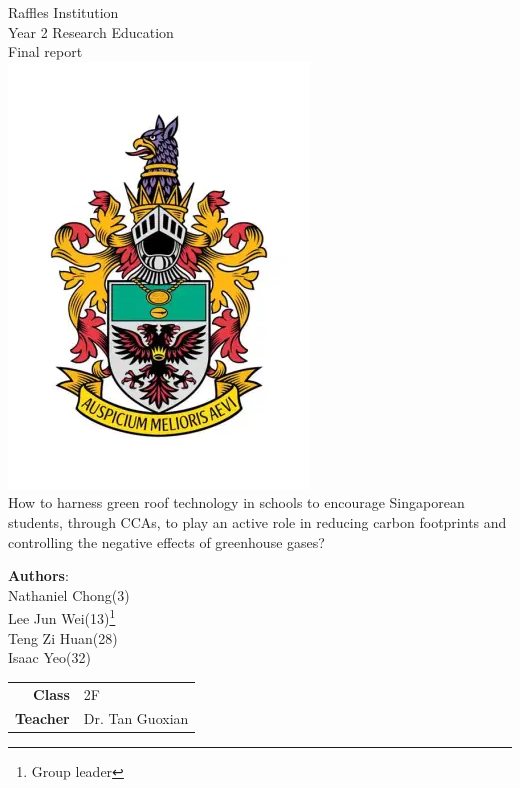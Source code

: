 \documentclass[a4paper]{article}
\begin{document}
\begin{titlepage}
  \Centering
  \Large{Raffles Institution \\ Year 2 Research Education \\ Final report} \\
  \includegraphics[scale=0.5]{ri-school-crest.png} \\
  \huge{How to harness green roof technology in schools to encourage
    Singaporean students, through CCAs, to play an active role in reducing
    carbon footprints and controlling the negative effects of greenhouse
    gases?
  } \\
  \vspace{1cm}
  \large{
    \textbf{Authors}: \\
    Nathaniel Chong(3) \\
    Lee Jun Wei(13)\footnote{Group leader} \\
    Teng Zi Huan(28) \\
    Isaac Yeo(32) \\
    \vspace{1cm}
    \begin{tabular}{r@{:}l}
      \textbf{Class} & \hspace{1cm} 2F \\
      \textbf{Teacher} & \hspace{1cm} Dr. Tan Guoxian \\
    \end{tabular}
  }
\end{titlepage}
\end{document}
